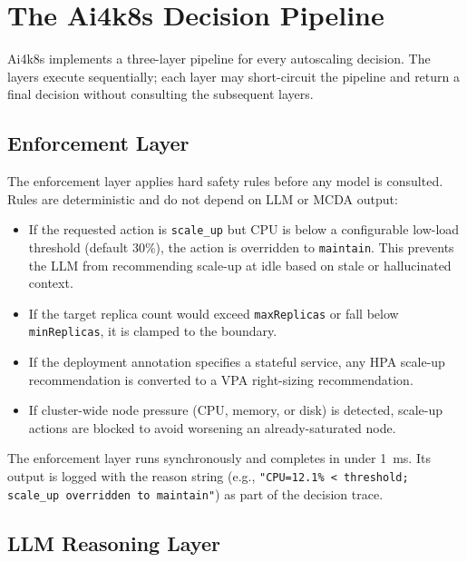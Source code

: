 \section{The Ai4k8s Decision Pipeline}
\label{sec:pipeline}

Ai4k8s implements a three-layer pipeline for every autoscaling decision.
The layers execute sequentially; each layer may short-circuit the pipeline
and return a final decision without consulting the subsequent layers.

\subsection{Enforcement Layer}
\label{sec:enforcement}

The enforcement layer applies hard safety rules before any model is consulted.
Rules are deterministic and do not depend on LLM or MCDA output:

\begin{itemize}
  \item If the requested action is \texttt{scale\_up} but CPU is below a
  configurable low-load threshold (default 30\%), the action is overridden to
  \texttt{maintain}. This prevents the LLM from recommending scale-up at idle
  based on stale or hallucinated context.

  \item If the target replica count would exceed \texttt{maxReplicas} or fall
  below \texttt{minReplicas}, it is clamped to the boundary.

  \item If the deployment annotation specifies a stateful service, any HPA
  scale-up recommendation is converted to a VPA right-sizing recommendation.

  \item If cluster-wide node pressure (CPU, memory, or disk) is detected,
  scale-up actions are blocked to avoid worsening an already-saturated node.
\end{itemize}

The enforcement layer runs synchronously and completes in under 1~ms. Its output
is logged with the reason string (e.g., \texttt{"CPU=12.1\% < threshold;
scale\_up overridden to maintain"}) as part of the decision trace.

\subsection{LLM Reasoning Layer}
\label{sec:llm-layer}


